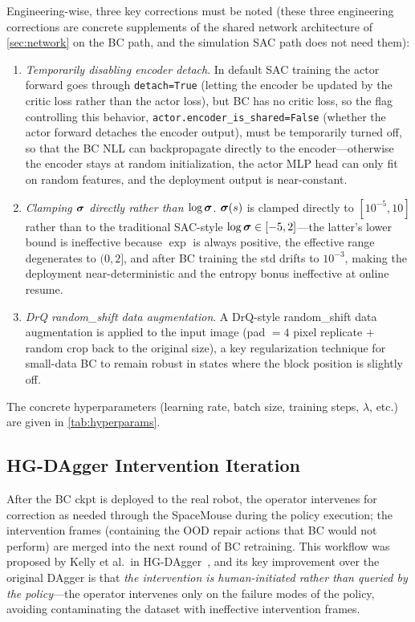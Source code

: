 Engineering-wise, three key corrections must be noted (these three engineering corrections are concrete supplements of the shared network architecture of \cref{sec:network} on the BC path, and the simulation SAC path does not need them):
\begin{enumerate}
  \item \emph{Temporarily disabling encoder detach}. In default SAC training the actor forward goes through \texttt{detach=True} (letting the encoder be updated by the critic loss rather than the actor loss), but BC has no critic loss, so the flag controlling this behavior, \texttt{actor.encoder\_is\_shared=False} (whether the actor forward detaches the encoder output), must be temporarily turned off, so that the BC NLL can backpropagate directly to the encoder---otherwise the encoder stays at random initialization, the actor MLP head can only fit on random features, and the deployment output is near-constant.
  \item \emph{Clamping $\bm{\sigma}$ directly rather than $\log\bm{\sigma}$}. $\bm{\sigma}(s)$ is clamped directly to $[10^{-5}, 10]$ rather than to the traditional SAC-style $\log\bm{\sigma} \in [-5, 2]$---the latter's lower bound is ineffective because $\exp$ is always positive, the effective range degenerates to $(0, 2]$, and after BC training the std drifts to $10^{-3}$, making the deployment near-deterministic and the entropy bonus ineffective at online resume.
  \item \emph{DrQ random\_shift data augmentation}. A DrQ-style random\_shift data augmentation is applied to the input image (pad $= 4$ pixel replicate $+$ random crop back to the original size), a key regularization technique for small-data BC to remain robust in states where the block position is slightly off.
\end{enumerate}
The concrete hyperparameters (learning rate, batch size, training steps, $\lambda$, etc.) are given in \cref{tab:hyperparams}.

\subsection{HG-DAgger Intervention Iteration}\label{subsec:hg_dagger}

After the BC ckpt is deployed to the real robot, the operator intervenes for correction as needed through the SpaceMouse during the policy execution; the intervention frames (containing the OOD repair actions that BC would not perform) are merged into the next round of BC retraining. This workflow was proposed by Kelly et al.\ in HG-DAgger~\cite{kelly2019hgdagger}, and its key improvement over the original DAgger is that \emph{the intervention is human-initiated rather than queried by the policy}---the operator intervenes only on the failure modes of the policy, avoiding contaminating the dataset with ineffective intervention frames.

